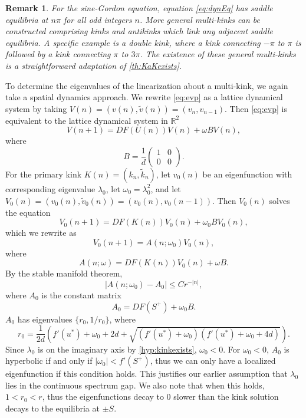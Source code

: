 \documentclass[12pt,reqno]{amsart}
\def\R{{\mathbb R}}
\newtheorem{remark}{Remark}
\begin{document}
\begin{remark}\label{rem:SGmulitkinks}
For the sine-Gordon equation, equation \cref{eq:dynEq} has saddle equilibria at $n \pi$ for all odd integers $n$. More general multi-kinks can be constructed comprising kinks and antikinks which link any adjacent saddle equilibria. A specific example is a double kink, where a kink  connecting $-\pi$ to $\pi$ is followed by a kink connecting $\pi$ to $3 \pi$. The existence of these general multi-kinks is a straightforward adaptation of \cref{th:KaKexists}.
\end{remark}

To determine the eigenvalues of the linearization about a multi-kink, we again take a spatial dynamics approach. We rewrite \cref{eq:evp} as a lattice dynamical system by taking $V(n) = (v(n), \tilde{v}(n)) = (v_n, v_{n-1})$. Then \cref{eq:evp} is equivalent to the lattice dynamical system in $\R^2$
\begin{equation}\label{eq:EVPdyneq}
V(n+1) = D F( U(n) )V(n) + \omega B V(n),
\end{equation}
where
\[
B = \frac{1}{d}
\begin{pmatrix}1 & 0 \\ 0 & 0
\end{pmatrix}.
\] 
For the primary kink $K(n) = (k_n, \tilde{k}_n)$, let $v_0(n)$ be an eigenfunction with corresponding eigenvalue $\lambda_0$, let $\omega_0 = \lambda_0^2$, and let $V_0(n) = (v_0(n), \tilde{v}_0(n)) = (v_0(n), v_0(n-1))$. Then $V_0(n)$ solves the equation
\begin{equation}\label{eq:V0eq}
V_0(n+1) = D F( K(n) )V_0(n) + \omega_0 B V_0(n),
\end{equation}
which we rewrite as
\begin{equation}\label{eq:V0Aeq}
	V_0(n+1) = A(n; \omega_0) V_0(n),
\end{equation}
where
\begin{equation}\label{eq:Aomegaeq}
	A(n; \omega) = D F( K(n) )V_0(n) + \omega B.
\end{equation}
By the stable manifold theorem, 
\begin{equation}\label{eq:A0decay}
	|A(n; \omega_0) - A_0| \leq C r^{-|n|},
\end{equation}
where $A_0$ is the constant matrix
\begin{equation}
	A_0 = DF(S^+) + \omega_0 B.
\end{equation}
$A_0$ has eigenvalues $\{ r_0, 1/r_0 \}$, where
\begin{equation}\label{eq:r0}
r_0 = \frac{1}{2d}\left( f'(u^*) + \omega_0 + 2d + \sqrt{(f'(u^*)+ \omega_0)(f'(u^*) + \omega_0 + 4d)} \right).
\end{equation}
Since $\lambda_0$ is on the imaginary axis by \cref{hyp:kinkexists}, $\omega_0 < 0$. For $\omega_0 < 0$, $A_0$ is hyperbolic if and only if $|\omega_0| < f'(S^+)$, thus we can only have a localized eigenfunction if this condition holds. This justifies our earlier assumption that $\lambda_0$ lies in the continuous spectrum gap. We also note that when this holds, $1 < r_0 < r$, thus the eigenfunctions decay to 0 slower than the kink solution decays to the equilibria at $\pm S$.
\end{document}

